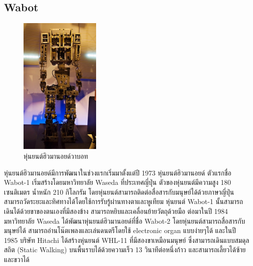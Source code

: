 \subsection*{Wabot}
\begin{figure}[htbp]
    \centering
    \includegraphics[width=0.35\textwidth]{chapter2/images/wabot.jpg}
    \caption{หุ่นยนต์ฮิวมานอยด์วาบอท}
    \label{fig:wabot_humanoid}
\end{figure}
\hspace*{10mm} หุ่นยนต์ฮิวมานอยด์มีการพัฒนาในช่วงแรกเริ่มมาตั้งแต่ปี 1973 หุ่นยนต์ฮิวมานอยด์ ตัวแรกชื่อ Wabot-1 เริ่มสร้างโดยมหาวิทยาลัย Waseda ที่ประเทศญี่ปุ่น ตัวของหุ่นยนต์มีความสูง 180 เซนติเมตร
น้ำหนัก 210 กิโลกรัม โดยหุ่นยนต์สามารถติดต่อสื่อสารกับมนุษย์ได้ด้วยภาษาญี่ปุ่น สามารถวัดระยะและทิศทางได้โดยใช้การรับรู้ผ่านทางตาและหูเทียม หุ่นยนต์ Wabot-1 นั้นสามารถเดินได้ด้วยขาของตนเองที่มีสองข้าง
สามารถหยิบและเคลื่อนย้ายวัตถุด้วยมือ ต่อมาในปี 1984 มหาวิทยาลัย Waseda ได้พัฒนาหุ่นยนต์ฮิวมานอยด์ที่ชื่อ Wabot-2 โดยหุ่นยนต์สามารถสื่อสารกับมนุษย์ได้ สามารถอ่านโน๊ตเพลงและเล่นดนตรีโดยใช้ electronic organ แบบง่ายๆได้
และในปี 1985 บริษัท Hitachi ได้สร้างหุ่นยนต์ WHL-11 ที่มีสองขาเหมือนมนุษย์ ซึ่งสามารถเดินแบบสมดุลสถิต (Static Walking) บนพื้นราบได้ด้วยความเร็ว 13 วินาทีต่อหนึ่งก้าว และสามารถเลี้ยวได้ซ้ายและขวาได้
